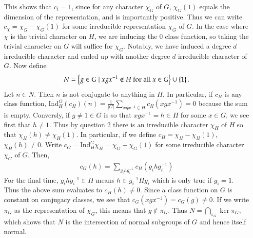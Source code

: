 \documentclass[12pt]{article}
\theoremstyle{definitionstyle}
\newcommand{\SET}[1]{\Set{\mskip-\medmuskip #1 \mskip-\medmuskip}}
\newcommand{\Ind}{\mathrm{Ind}}
\begin{document}
\begin{enumerate}
        This shows that $c_i = 1$, since for any character $\chi_G$ of $G$, $\chi_G(1)$ equals the dimension of the representation, and is importantly positive. Thus we can write $c_\chi = \chi_G - \chi_G(1)$ for some irreducible representation $\chi_G$ of $G$. In the case where $\chi$ is the trivial character on $H$, we are inducing the 0 class function, so taking the trivial character on $G$ will suffice for $\chi_G$. Notably, we have induced a degree $d$ irreducible character and ended up with another degree $d$ irreducible character of $G$. Now define
        \begin{align*}
            N = \SET{g \in G \mid xgx^{-1} \not \in H \text{ for all } x \in G} \cup \SET{1}.
        \end{align*}
        Let $n \in N$. Then $n$ is not conjugate to anything in $H$. In particular, if $c_H$ is any class function, $\Ind_H^G(c_H)(n) = \frac{1}{|G|} \sum_{xgx^{-1} \in H} c_H(xgx^{-1}) = 0$ because the sum is empty. Conversly, if $g \neq 1 \in G$ is so that $xgx^{-1} = h \in H$ for some $x \in G$, we see first that $h \neq 1$. Thus by question 2 there is an irreducible character $\chi_H$ of $H$ so that $\chi_H(h) \neq \chi_H(1)$. In particular, if we define $c_H = \chi_H - \chi_H(1)$, $\chi_H(h) \neq 0$. Write $c_G = \Ind_H^G \chi_H = \chi_G - \chi_G(1)$ for some irreducible character $\chi_G$ of $G$. Then,
        \begin{align*}
            c_G(h) = \sum_{g_ihg_i^{-1}} c_H(g_ihg_i^{-1})
        \end{align*}
        For the final time, $g_ihg_i^{-1} \in H$ means $h \in g_i^{-1}Hg_i$ which is only true if $g_i = 1$. Thus the above sum evaluates to $c_H(h) \neq 0$. Since a class function on $G$ is constant on conjugacy classes, we see that $c_G(xgx^{-1}) = c_G(g) \neq 0$. If we write $\pi_G$ as the representation of $\chi_G$, this means that $g \not \in \pi_G$. Thus $N = \bigcap_{\pi_G} \ker \pi_G$, which shows that $N$ is the intersection of normal subgroups of $G$ and hence itself normal.


\end{enumerate}
\end{document}
